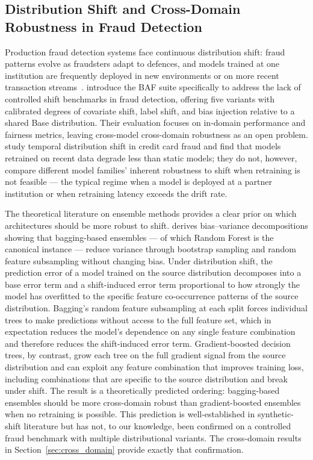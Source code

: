 \documentclass[a4paper,fleqn]{cas-sc}
\begin{document}
\subsection{Distribution Shift and Cross-Domain Robustness in Fraud Detection}
\label{sec:rw_shift}

Production fraud detection systems face continuous distribution shift:
fraud patterns evolve as fraudsters adapt to defences, and models trained
at one institution are frequently deployed in new environments or on more
recent transaction streams~\citep{dalpozzolo2017realistic,rymantubb2018survey,hoppner2021idcs}.
\citet{jesus2022turning} introduce the BAF suite specifically to address the
lack of controlled shift benchmarks in fraud detection, offering five variants
with calibrated degrees of covariate shift, label shift, and bias injection
relative to a shared Base distribution.
Their evaluation focuses on in-domain performance and fairness metrics, leaving
cross-model cross-domain robustness as an open problem.
\citet{hoppner2021idcs} study temporal distribution shift in credit card fraud
and find that models retrained on recent data degrade less than static models;
they do not, however, compare different model families' inherent robustness
to shift when retraining is not feasible --- the typical regime when a model
is deployed at a partner institution or when retraining latency exceeds the
drift rate.

The theoretical literature on ensemble methods provides a clear prior on which
architectures should be more robust to shift.
\citet{breiman2001random} derives bias--variance decompositions showing that
bagging-based ensembles --- of which Random Forest is the canonical instance ---
reduce variance through bootstrap sampling and random feature subsampling
without changing bias.
Under distribution shift, the prediction error of a model trained on the
source distribution decomposes into a base error term and a shift-induced
error term proportional to how strongly the model has overfitted to the
specific feature co-occurrence patterns of the source distribution.
Bagging's random feature subsampling at each split forces individual trees
to make predictions without access to the full feature set, which in
expectation reduces the model's dependence on any single feature combination
and therefore reduces the shift-induced error term.
Gradient-boosted decision trees, by contrast, grow each tree on the full
gradient signal from the source distribution and can exploit any feature
combination that improves training loss, including combinations that are
specific to the source distribution and break under shift.
The result is a theoretically predicted ordering: bagging-based ensembles
should be more cross-domain robust than gradient-boosted ensembles when no
retraining is possible.
This prediction is well-established in synthetic-shift literature but has not,
to our knowledge, been confirmed on a controlled fraud benchmark with multiple
distributional variants.
The cross-domain results in Section~\ref{sec:cross_domain} provide exactly
that confirmation.
\end{document}
